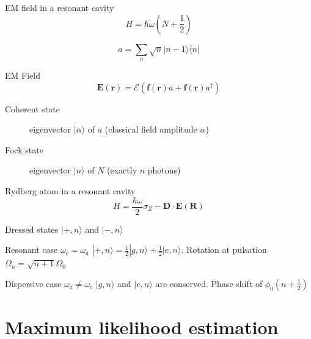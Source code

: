 \documentclass{beamer}
\newcommand{\ket}[1]{|#1\rangle}
\newcommand{\bra}[1]{\langle#1|}
\newcommand{\bs}{\boldsymbol}
\begin{document}
\begin{frame}{EM field in a resonant cavity}
  \[H = \hbar\omega \left(N +\frac12\right)\]

  \[a = \sum_n \sqrt{n} \ket {n-1} \bra n\]

  \pause{}

  \begin{block}{EM Field}
    \[\bs{E}(\bs r) = \mathcal{E}(\bs f(\bs r) a + \bs f(\bs r) a^\dagger)\]
  \end{block}

  \pause{}

  \begin{description}
  \item[Coherent state] eigenvector $\ket \alpha$ of $a$ (classical field amplitude
    $\alpha$)
  \item[Fock state] eigenvector $\ket n$ of $N$ (exactly $n$ photons)
  \end{description}

\end{frame}

\begin{frame}{Rydberg atom in a resonant cavity}
  \[H = \frac{\hbar \omega}2 \sigma_Z - \bs D \cdot \bs E(\bs R)\]

  \pause{}

  \begin{block}{Dressed states}
    $\ket{+,n}$ and $\ket{-,n}$
  \end{block}

  \pause{}


  \begin{block}{Resonant case $\omega_c = \omega_a$}
    $\ket{+,n} = \frac12 \ket{g,n} + \frac12 \ket{e,n}$. Rotation at pulsation $\Omega_n =
    \sqrt{n+1} \Omega_0$
  \end{block}

  \pause{}

  \begin{block}{Dispersive case $\omega_a \neq \omega_c$}
    $\ket{g,n}$ and $\ket{e,n}$ are conserved. Phase shift of $\phi_0(n+\frac12)$
  \end{block}



\end{frame}



\section{Maximum likelihood estimation}
\end{document}
